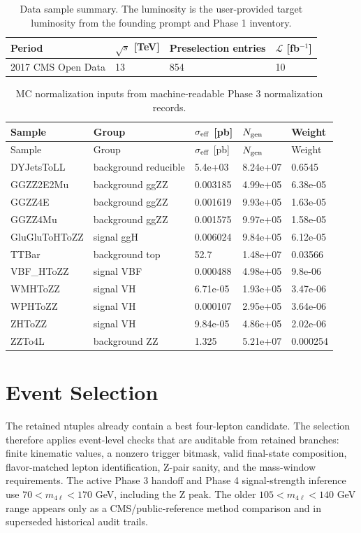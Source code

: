 \documentclass[11pt]{article}
\begin{document}
\begin{table}[htbp]
\centering
\caption{Data sample summary. The luminosity is the user-provided target luminosity from the founding prompt and Phase 1 inventory.}
\begin{tabular}{llll}
\toprule
Period & $\sqrt{s}$ [TeV] & Preselection entries & $\mathcal{L}$ [fb$^{-1}$] \\ 
\midrule
2017 CMS Open Data & 13 & 854 & 10 \\ 
\bottomrule
\end{tabular}
\label{tab:data-summary}
\end{table}

\begin{longtable}{lllll}
\caption{MC normalization inputs from machine-readable Phase 3 normalization records.}\label{tab:mc-samples}\\
\toprule
Sample & Group & $\sigma_{\rm eff}$ [pb] & $N_{\rm gen}$ & Weight \\ 
\midrule
\endfirsthead
\toprule
Sample & Group & $\sigma_{\rm eff}$ [pb] & $N_{\rm gen}$ & Weight \\ 
\midrule
\endhead
DYJetsToLL & background reducible & 5.4e+03 & 8.24e+07 & 0.6545 \\
GGZZ2E2Mu & background ggZZ & 0.003185 & 4.99e+05 & 6.38e-05 \\
GGZZ4E & background ggZZ & 0.001619 & 9.93e+05 & 1.63e-05 \\
GGZZ4Mu & background ggZZ & 0.001575 & 9.97e+05 & 1.58e-05 \\
GluGluToHToZZ & signal ggH & 0.006024 & 9.84e+05 & 6.12e-05 \\
TTBar & background top & 52.7 & 1.48e+07 & 0.03566 \\
VBF\_HToZZ & signal VBF & 0.000488 & 4.98e+05 & 9.8e-06 \\
WMHToZZ & signal VH & 6.71e-05 & 1.93e+05 & 3.47e-06 \\
WPHToZZ & signal VH & 0.000107 & 2.95e+05 & 3.64e-06 \\
ZHToZZ & signal VH & 9.84e-05 & 4.86e+05 & 2.02e-06 \\
ZZTo4L & background ZZ & 1.325 & 5.21e+07 & 0.000254 \\
\bottomrule
\end{longtable}


\section{Event Selection}
The retained ntuples already contain a best four-lepton candidate. The selection therefore applies event-level checks that are auditable from retained branches: finite kinematic values, a nonzero trigger bitmask, valid final-state composition, flavor-matched lepton identification, Z-pair sanity, and the mass-window requirements. The active Phase 3 handoff and Phase 4 signal-strength inference use $70<m_{4\ell}<170$ GeV, including the Z peak. The older $105<m_{4\ell}<140$ GeV range appears only as a CMS/public-reference method comparison and in superseded historical audit trails.
\end{document}
